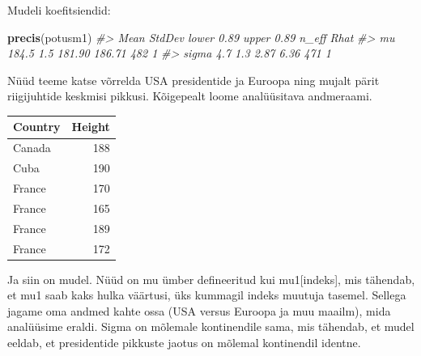 \documentclass[]{book}
\newenvironment{Shaded}{\begin{snugshade}}{\end{snugshade}}
\newcommand{\KeywordTok}[1]{\textcolor[rgb]{0.13,0.29,0.53}{\textbf{#1}}}
\newcommand{\DataTypeTok}[1]{\textcolor[rgb]{0.13,0.29,0.53}{#1}}
\newcommand{\StringTok}[1]{\textcolor[rgb]{0.31,0.60,0.02}{#1}}
\newcommand{\CommentTok}[1]{\textcolor[rgb]{0.56,0.35,0.01}{\textit{#1}}}
\newcommand{\OperatorTok}[1]{\textcolor[rgb]{0.81,0.36,0.00}{\textbf{#1}}}
\newcommand{\NormalTok}[1]{#1}
\begin{document}
Mudeli koefitsiendid:

\begin{Shaded}
\begin{Highlighting}[]
\KeywordTok{precis}\NormalTok{(potusm1)}
\CommentTok{#>        Mean StdDev lower 0.89 upper 0.89 n_eff Rhat}
\CommentTok{#> mu    184.5    1.5     181.90     186.71   482    1}
\CommentTok{#> sigma   4.7    1.3       2.87       6.36   471    1}
\end{Highlighting}
\end{Shaded}

Nüüd teeme katse võrrelda USA presidentide ja Euroopa ning mujalt pärit
riigijuhtide keskmisi pikkusi. Kõigepealt loome analüüsitava andmeraami.

\begin{Shaded}
\end{Shaded}

\begin{tabular}{l|r}
\hline
Country & Height\\
\hline
Canada & 188\\
\hline
Cuba & 190\\
\hline
France & 170\\
\hline
France & 165\\
\hline
France & 189\\
\hline
France & 172\\
\hline
\end{tabular}

Ja siin on mudel. Nüüd on mu ümber defineeritud kui mu1{[}indeks{]}, mis
tähendab, et mu1 saab kaks hulka väärtusi, üks kummagil indeks muutuja
tasemel. Sellega jagame oma andmed kahte ossa (USA versus Euroopa ja muu
maailm), mida analüüsime eraldi. Sigma on mõlemale kontinendile sama,
mis tähendab, et mudel eeldab, et presidentide pikkuste jaotus on
mõlemal kontinendil identne.

\begin{Shaded}
\end{Shaded}
\end{document}
